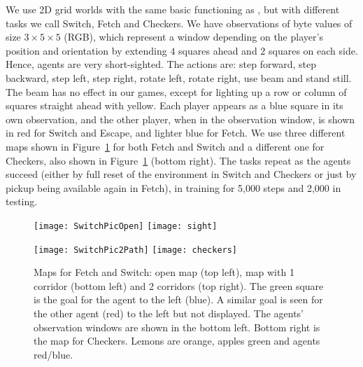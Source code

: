 \documentclass{article}
\begin{document}
\begin{SCfigure}
We use 2D grid worlds with the same basic functioning as \citet{leibo2017}, but with different tasks we call Switch, Fetch and Checkers. We have observations of byte values of size $3\times5\times5$ (RGB), which represent a window depending on the player’s position and orientation by extending $4$ squares ahead
and $2$ squares on each side. Hence, agents are very short-sighted. The actions are: step forward, step backward,
step left, step right, rotate left, rotate right, use beam
and stand still. The beam has no effect in our games, except for lighting up a row or column of squares straight ahead with yellow. Each player appears as a  blue square in its own observation, and the other player, when in the observation window, is shown in red for Switch and Escape, and lighter blue for Fetch. We use three different maps shown in Figure~\ref{S0} for both Fetch and Switch and a different one for Checkers, also shown in Figure~\ref{S0} (bottom right). The tasks repeat as the agents succeed (either by full reset of the environment in Switch and Checkers or just by pickup being available again in Fetch), in training for 5,000 steps and 2,000 in testing.










\begin{figure}
\begin{minipage}{.5\textwidth}
\centering
\texttt{[image: SwitchPicOpen]}
\vspace{0.05cm}
\texttt{[image: sight]}


\end{minipage}
\begin{minipage}{.5\textwidth}
\centering
\texttt{[image: SwitchPic2Path]}
\vspace{0.05cm}
\texttt{[image: checkers]} \end{minipage}
\caption{Maps for Fetch and Switch: open map (top left), map with 1 corridor (bottom left) and 2 corridors (top right). The green square is the goal for the agent to the left (blue). A similar goal is seen for the other agent (red) to the left but not displayed. The agents' observation windows are shown in the bottom left. Bottom right is the map for Checkers. Lemons are orange, apples green and agents red/blue.} \label{S0}
\end{figure}











\end{SCfigure}
\end{document}
